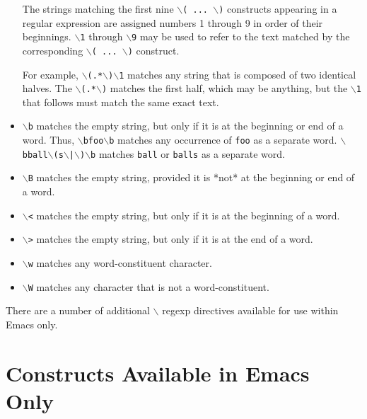 \begin{itemize}
The strings matching the first nine {\tt $\backslash$( ... $\backslash$)} constructs
appearing in a regular expression are assigned numbers 1 through
9 in order of their beginnings. {\tt $\backslash$1} through {\tt $\backslash$9} may be used
to refer to the text matched by the corresponding {\tt $\backslash$( ... $\backslash$)} 
construct.

For example, {\tt $\backslash$(.*$\backslash$)$\backslash$1} matches any string that is composed of
two identical halves. The {\tt $\backslash$(.*$\backslash$)} matches the first half,
which may be anything, but the {\tt $\backslash$1} that follows must match the
same exact text.

\item \rtfsp
{\tt $\backslash$b} 
matches the empty string, but only if it is at the beginning or
end of a word. Thus, {\tt $\backslash$bfoo$\backslash$b} matches any occurrence of {\tt foo}
as a separate word. {\tt $\backslash$bball$\backslash$(s$\backslash$|$\backslash$)$\backslash$b} matches {\tt ball} or {\tt balls}
as a separate word.

\item \rtfsp
{\tt $\backslash$B} 
matches the empty string, provided it is *not* at the beginning
or end of a word.

\item \rtfsp
{\tt $\backslash$<} 
matches the empty string, but only if it is at the beginning of
a word.

\item \rtfsp
{\tt $\backslash$>} 
matches the empty string, but only if it is at the end of a word.

\item \rtfsp
{\tt $\backslash$w} 
matches any word-constituent character.

\item \rtfsp
{\tt $\backslash$W} 
matches any character that is not a word-constituent.

\end{itemize}

There are a number of additional {\tt $\backslash$} regexp directives available for
use within Emacs only.



\section{Constructs Available in Emacs Only}

